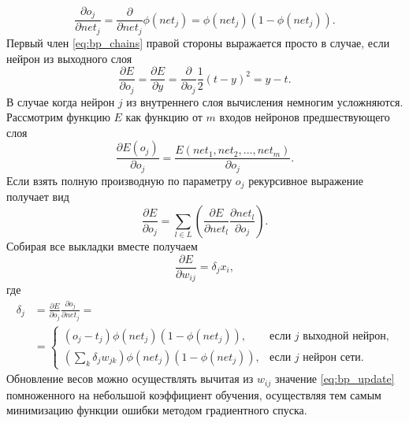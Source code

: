 \documentclass[a4paper,10pt]{article}
\begin{document}
\begin{equation}
\frac{{\partial o_{j}}}{\partial net_{j}} = \frac{\partial}{\partial net_{j}} \phi(net_{j}) = \phi(net_{j})(1-\phi(net_{j})).
\end{equation}
\indent Первый член \eqref{eq:bp_chains} правой стороны выражается просто в случае, если нейрон из выходного слоя
\begin{equation}
\frac{\partial E}{\partial o_{j}} = \frac{\partial E}{\partial y} = \frac{\partial}{\partial o_{j}} \frac{1}{2} (t-y)^2 = y - t  .
\end{equation}
\indent В случае когда нейрон $j$ из внутреннего слоя вычисления немногим усложняются. Рассмотрим функцию $E$ как функцию от $m$ входов нейронов предшествующего слоя
\begin{equation}
\frac{\partial E(o_{j})}{\partial o_{j}} = \frac{E(net_{1}, net_{2},...,net_{m})}{\partial o_{j}}.
\end{equation}
\indent Если взять полную производную по параметру $o_{j}$ рекурсивное выражение получает вид
\begin{equation}
\frac{\partial E}{\partial o_{j}} = \sum_{l\in L}\left(\frac{\partial E}{\partial net_{l}} \frac{\partial net_{l}}{\partial o_{j}}\right).
\end{equation}
\indent Собирая все выкладки вместе получаем
\begin{equation}\label{eq:bp_update}
\frac{\partial E}{\partial w_{ij}} = \delta_{j} x_{i},
\end{equation}
где
\begin{equation}
\begin{split}
\delta_{j} &= \frac{\partial E}{\partial o_{j}} \frac{\partial o_{j}}{\partial net_{j}} = \\ &=\begin{cases} (o_{j}-t_{j}) \phi(net_{j})(1-\phi(net_{j})), & \mbox{если }j\mbox{ выходной нейрон,} \\ (\sum_{k}\delta_{j}w_{jk})\phi(net_{j})(1-\phi(net_{j})), & \mbox{если }j\mbox{ нейрон сети.} \end{cases}
\end{split}
\end{equation}
\indent Обновление весов можно осуществлять вычитая из $w_{ij}$ значение \eqref{eq:bp_update} помноженного на небольшой коэффициент обучения, осуществляя тем самым минимизацию функции ошибки методом градиентного спуска.
\end{document}
